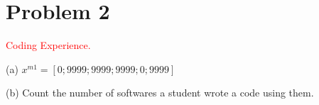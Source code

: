 \documentclass[12pt]{article}
\begin{document}
\newpage


\section{Problem 2}
\textcolor{red}{Coding Experience.}

\vspace{0.2 in}

(a) $x^{m1}= [0;9999;9999;9999;0;9999]$

\vspace{0.2 in}

(b) Count the number of softwares a student wrote a code using them.



\end{document}
